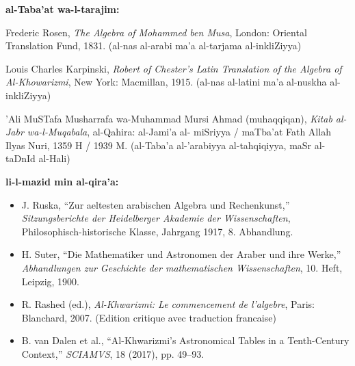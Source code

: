 \documentclass[11pt,a4paper]{book}
\begin{document}
\vspace{0.3cm}

\begin{historicalbox}
\textbf{al-Taba'at wa-l-tarajim:}

\begin{enumerate}[label={[\arabic*]},rightmargin=1em]
  \item Frederic Rosen, \textit{The Algebra of Mohammed ben Musa},
  London: Oriental Translation Fund, 1831. (al-nas al-arabi ma'a
  al-tarjama al-inkliZiyya)

  \item Louis Charles Karpinski, \textit{Robert of Chester's Latin
  Translation of the Algebra of Al-Khowarizmi}, New York: Macmillan,
  1915. (al-nas al-latini ma'a al-nuskha al-inkliZiyya)

  \item 'Ali MuSTafa Musharrafa wa-Muhammad Mursi Ahmad (muhaqqiqan),
  \textit{Kitab al-Jabr wa-l-Muqabala}, al-Qahira: al-Jami'a al-
  miSriyya / maTba'at Fath Allah Ilyas Nuri, 1359 H / 1939 M.
  (al-Taba'a al-'arabiyya al-tahqiqiyya, maSr al-taDnId al-Hali)
\end{enumerate}
\end{historicalbox}

\vspace{0.3cm}

\begin{historicalbox}
\textbf{li-l-mazid min al-qira'a:}

\begin{itemize}[rightmargin=1em]
  \item J. Ruska, ``Zur aeltesten arabischen Algebra und Rechenkunst,''
  \textit{Sitzungsberichte der Heidelberger Akademie der Wissenschaften},
  Philosophisch-historische Klasse, Jahrgang 1917, 8. Abhandlung.

  \item H. Suter, ``Die Mathematiker und Astronomen der Araber und ihre
  Werke,'' \textit{Abhandlungen zur Geschichte der mathematischen
  Wissenschaften}, 10. Heft, Leipzig, 1900.

  \item R. Rashed (ed.), \textit{Al-Khwarizmi: Le commencement de
  l'algebre}, Paris: Blanchard, 2007. (Edition critique avec traduction
  francaise)

  \item B. van Dalen et al., ``Al-Khwarizmi's Astronomical Tables in
  a Tenth-Century Context,'' \textit{SCIAMVS}, 18 (2017), pp. 49--93.
\end{itemize}
\end{historicalbox}
\end{document}
